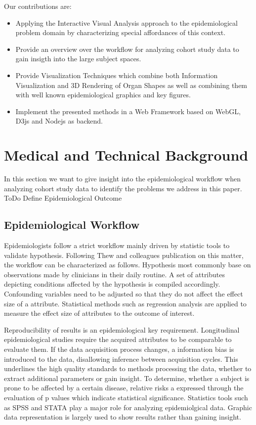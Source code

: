 \documentclass[journal]{style/vgtc}           %
\begin{document}
Our contributions are:
\begin{itemize}
	\item Applying the Interactive Visual Analysis approach to the epidemiological problem domain by characterizing special affordances of this context.
	\item Provide an overview over the workflow for analyzing cohort study data to gain insigth into the large subject spaces.
	\item Provide Visualization Techniques which combine both Information Visualization and 3D Rendering of Organ Shapes as well as combining them with well known epidemiological graphics and key figures.
	\item Implement the presented methods in a Web Framework based on WebGL, D3js and Nodejs as backend.
\end{itemize}



\section{Medical and Technical Background}
In this section we want to give insight into the epidemiological workflow when analyzing cohort study data to identify the problems we address in this paper.
%
ToDo Define Epidemiological Outcome
%
\subsection{Epidemiological Workflow}
Epidemiologists follow a strict workflow mainly driven by statistic tools to validate hypothesis.
%
Following Thew and colleagues publication on this matter, the workflow can be characterized as follows.
%
Hypothesis most commonly base on observations made by clinicians in their daily routine.
%
A set of attributes depicting conditions affected by the hypothesis is compiled accordingly.
%
Confounding variables need to be adjusted so that they do not affect the effect size of a attribute.
%
Statistical methods such as regression analysis are applied to measure the effect size of attributes to the outcome of interest.
%

Reproducibility of results is an epidemiological key requirement.
%
Longitudinal epidemiological studies require the acquired attributes to be comparable to evaluate them.
%
If the data acquisition process changes, a information bias is introduced to the data, disallowing inference between acquisition cycles.
%
This underlines the high quality standards to methods processing the data, whether to extract additional parameters or gain insight.
%
To determine, whether a subject is prone to be affected by a certain disease, relative risks a expressed through the evaluation of p values which indicate statistical significance.
%
Statistics tools such as SPSS and STATA play a major role for analyzing epidemiolgical data. 
%
Graphic data representation is largely used to show results rather than gaining insight.
\end{document}
